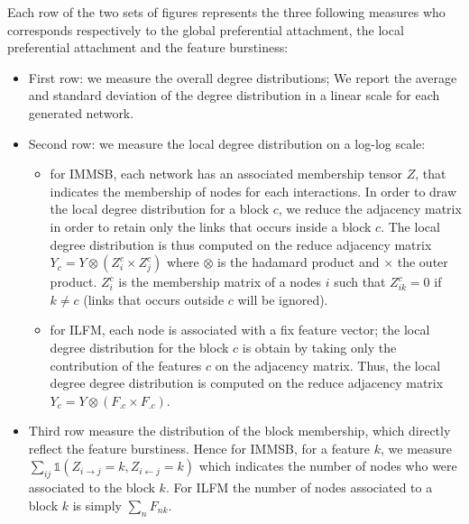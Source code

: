 \documentclass[a4paper, 12pt]{article}
\begin{document}
Each row of the two sets of figures represents the three following measures who corresponds respectively to the global preferential attachment, the local preferential attachment and the feature burstiness:
\begin{itemize}
    \item First row: we measure the overall degree distributions; We report the average and standard deviation of the degree distribution in a linear scale for each generated network.
    \item Second row: we measure the local degree distribution on a log-log scale:
        \begin{itemize}
            \item for IMMSB, each network has an associated membership tensor $Z$, that indicates the membership of nodes for each  interactions. In order to draw the local degree distribution for a block $c$, we reduce the adjacency matrix in order to retain only the links that occurs inside a block $c$. The local degree distribution is thus computed on the reduce adjacency matrix $Y_c = Y \otimes (Z_i^c \times Z_j^c)$ where $\otimes$ is the hadamard product and $\times$ the outer product. $Z_i^c$ is the membership matrix of a nodes $i$ such that $Z_{ik}^c=0$ if $k\neq c$ (links that occurs outside $c$ will be ignored).
            \item for ILFM, each node is associated with a fix feature vector; the local degree distribution for the block $c$ is obtain by taking only the contribution of the features $c$ on the adjacency matrix. Thus, the local degree degree distribution is computed on the reduce adjacency matrix $Y_c = Y \otimes (F_{.c}\times F_{.c})$. 
        \end{itemize}
    \item Third row measure the distribution of the block membership, which directly reflect the feature burstiness. Hence for IMMSB, for a feature $k$, we measure $\sum_{ij} \mathds{1}(Z_{i\rightarrow j} = k, Z_{i\leftarrow j} = k)$ which indicates the number of nodes who were associated to the block $k$. For ILFM the number of nodes associated to a block $k$ is simply $\sum_n F_{nk}$.
\end{itemize}


\end{document}
